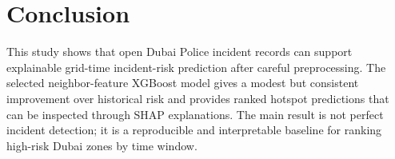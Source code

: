 \documentclass[conference]{IEEEtran}
\begin{document}
\section{Conclusion}

This study shows that open Dubai Police incident records can support explainable grid-time incident-risk prediction after careful preprocessing. The selected neighbor-feature XGBoost model gives a modest but consistent improvement over historical risk and provides ranked hotspot predictions that can be inspected through SHAP explanations. The main result is not perfect incident detection; it is a reproducible and interpretable baseline for ranking high-risk Dubai zones by time window.



\end{document}
